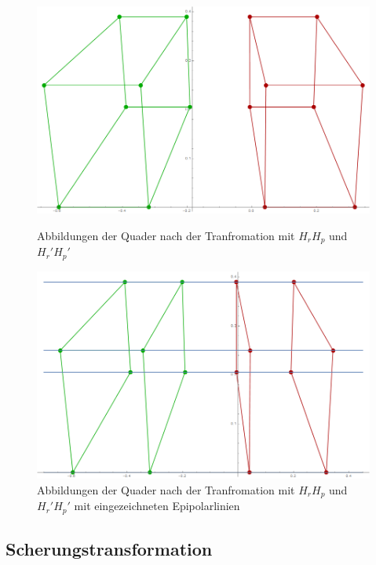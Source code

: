\begin{figure}[!htb]
	\includegraphics[width=\linewidth]{images/Rectification_HrHp_same_Solutions.png}
	\caption[Transformation $H_rH_p$ und $H_r'H_p'$ ]{Abbildungen der Quader nach der Tranfromation mit $H_rH_p$ und $H_r'H_p'$}
	\label{fig:RectSameHrHp1}
	\endminipage\hfill
	\includegraphics[width=\linewidth]{images/Rectification_HrHp_same_Solutions_Lines.png}
	\caption[Transformation $H_rH_p$ und $H_r'H_p'$ mit Epipolarlinien]{Abbildungen der Quader nach der Tranfromation mit $H_rH_p$ und $H_r'H_p'$ mit eingezeichneten Epipolarlinien}
	\label{fig:RectSameHrHp2}
	\endminipage\hfill
\end{figure}


\subsection{Scherungstransformation}

